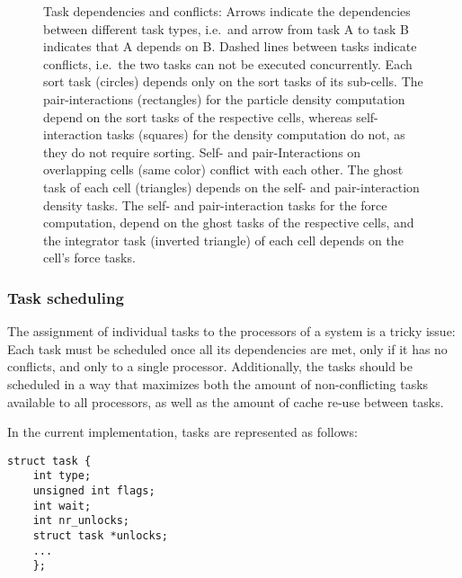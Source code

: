 \documentclass[final]{siamltex}
\begin{document}
\begin{figure}
    \centerline{}
    
    \caption{Task dependencies and conflicts:
        Arrows indicate the dependencies
        between different task types, i.e.~and arrow from task A to task
        B indicates that A depends on B.
        Dashed lines between tasks indicate conflicts, i.e.~the two tasks
        can not be executed concurrently.
        Each sort task (circles) depends
        only on the sort tasks of its sub-cells.
        The pair-interactions (rectangles) for the particle
        density computation depend on the sort tasks of the respective cells,
        whereas self-interaction tasks (squares) for the density computation
        do not, as they do not require sorting.
        Self- and pair-Interactions on overlapping cells (same color)
        conflict with each other.
        The ghost task of each cell (triangles) depends on the self-
        and pair-interaction density tasks.
        The self- and pair-interaction tasks for the force computation,
        depend on the ghost tasks of the respective cells,
        and the integrator task (inverted triangle) of each cell depends on the cell's
        force tasks.
        }
    \label{fig:Hierarchy2}
\end{figure}


\subsubsection{Task scheduling}

The assignment of individual tasks to the processors of a system
is a tricky issue:
Each task must be scheduled once all its dependencies are met,
only if it has no conflicts, and only to a single processor.
Additionally, the tasks should be scheduled in a way that
maximizes both the amount of non-conflicting tasks available to all
processors, as well as the amount of cache re-use between tasks.

In the current implementation, tasks are represented as follows:
        
\begin{center}\begin{minipage}{0.8\textwidth}
    \begin{lstlisting}
struct task {
    int type;
    unsigned int flags;
    int wait;
    int nr_unlocks;
    struct task *unlocks;
    ...
    };
    \end{lstlisting}
\end{minipage}\end{center}
\end{document}

